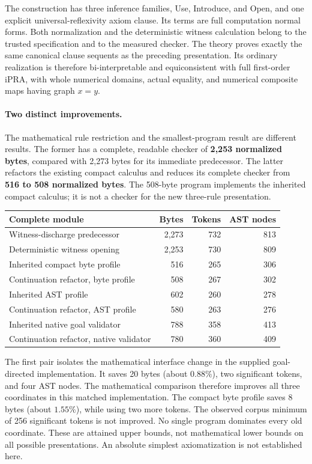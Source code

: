\documentclass[11pt,letterpaper]{article}
\theoremstyle{definition}
\begin{document}
The construction has three inference families, Use, Introduce, and Open,
and one explicit universal-reflexivity axiom clause.  Its terms are full
computation normal forms.  Both normalization and the deterministic witness
calculation belong to the trusted specification and to the measured checker.
The theory proves exactly the same canonical clause sequents as the preceding
presentation.  Its ordinary realization is therefore bi-interpretable and
equiconsistent with full first-order iPRA, with whole numerical domains,
actual equality, and numerical composite maps having graph $x=y$.

\paragraph{Two distinct improvements.}
The mathematical rule restriction and the smallest-program result are
different results.  The former has a complete, readable checker of
\textbf{2,253 normalized bytes}, compared with 2,273 bytes for its immediate
predecessor.  The latter refactors the existing compact calculus and reduces
its complete checker from \textbf{516 to 508 normalized bytes}.  The 508-byte
program implements the inherited compact calculus; it is not a checker for
the new three-rule presentation.

\begin{center}
\begin{tabular}{lrrr}
\toprule
Complete module & Bytes & Tokens & AST nodes\\
\midrule
Witness-discharge predecessor & 2,273 & 732 & 813\\
Deterministic witness opening & 2,253 & 730 & 809\\
\midrule
Inherited compact byte profile & 516 & 265 & 306\\
Continuation refactor, byte profile & 508 & 267 & 302\\
Inherited AST profile & 602 & 260 & 278\\
Continuation refactor, AST profile & 580 & 263 & 276\\
Inherited native goal validator & 788 & 358 & 413\\
Continuation refactor, native validator & 780 & 360 & 409\\
\bottomrule
\end{tabular}
\end{center}

The first pair isolates the mathematical interface change in the supplied
goal-directed implementation.  It saves 20 bytes (about $0.88\%$), two significant tokens, and four
AST nodes. The mathematical comparison therefore improves all three
coordinates in this matched implementation.  The compact byte
profile saves 8 bytes (about $1.55\%$), while using two more tokens.
The observed corpus minimum of 256 significant tokens is not improved.
No single program dominates every old coordinate.  These are attained
upper bounds, not mathematical lower bounds on all possible presentations.
An absolute simplest axiomatization is not established here.
\end{document}
